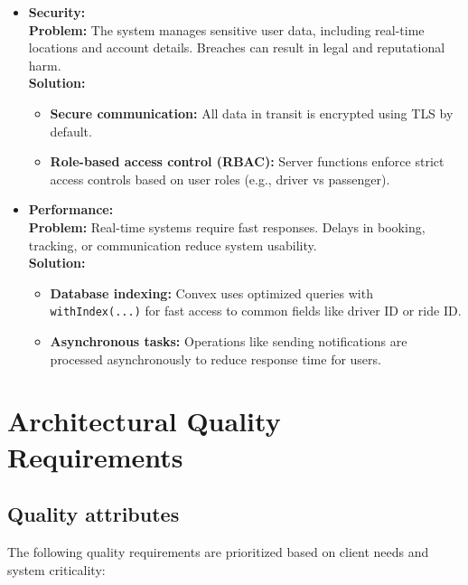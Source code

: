 \documentclass[12pt]{article}
\begin{document}
\begin{itemize}
  \item \textbf{Security:} \\
  \textbf{Problem:} The system manages sensitive user data, including real-time locations and account details. Breaches can result in legal and reputational harm. \\
  \textbf{Solution:} 
  \begin{itemize}
    \item \textbf{Secure communication:} All data in transit is encrypted using TLS by default.
    \item \textbf{Role-based access control (RBAC):} Server functions enforce strict access controls based on user roles (e.g., driver vs passenger).
  \end{itemize}

  \item \textbf{Performance:} \\
  \textbf{Problem:} Real-time systems require fast responses. Delays in booking, tracking, or communication reduce system usability. \\
  \textbf{Solution:} 
  \begin{itemize}
    \item \textbf{Database indexing:} Convex uses optimized queries with \texttt{withIndex(...)} for fast access to common fields like driver ID or ride ID.
    \item \textbf{Asynchronous tasks:} Operations like sending notifications are processed asynchronously to reduce response time for users.
  \end{itemize}
\end{itemize}

\section{Architectural Quality Requirements}
\subsection{Quality attributes}
The following quality requirements are prioritized based on client needs and system criticality:
\end{document}
